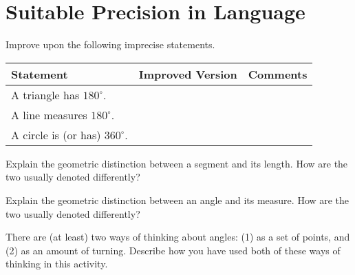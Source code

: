 \newpage
\section{Suitable Precision in Language}


\begin{prob}
Improve upon the following imprecise statements. 

{\renewcommand{\arraystretch}{1.5}
\begin{tabular}{|>{\centering\arraybackslash}m{4cm}|>{\centering\arraybackslash}m{9.5cm}|>{\centering\arraybackslash}m{4cm}|}\hline
Statement & Improved Version & Comments \\\hline

\rule{0pt}{1cm}A triangle has $180^\circ$. & & \\ \hline

\rule{0pt}{1cm}A line measures $180^\circ$. & & \\ \hline

\rule{0pt}{1cm}A circle is (or has) $360^\circ$. & & \\ \hline
 \hline
\end{tabular}}
\end{prob}

\begin{prob}
Explain the geometric distinction between a segment and its length.  How are the two usually denoted differently?  
\end{prob}
\vspace{.8in}

\begin{prob}
Explain the geometric distinction between an angle and its measure.  How are the two usually denoted differently?  
\end{prob}
\vspace{.8in}
\begin{prob}
There are (at least) two ways of thinking about angles:  (1) as a set of points, and (2) as an amount of turning.  
Describe how you have used both of these ways of thinking in this activity.  
\end{prob}

